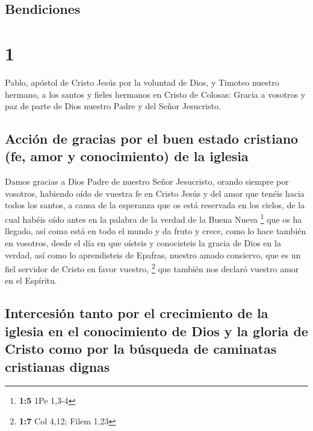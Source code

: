 \hypertarget{bendiciones}{%
\subsection{Bendiciones}\label{bendiciones}}

\hypertarget{section}{%
\section{1}\label{section}}

 Pablo, apóstol de Cristo Jesús por la voluntad de Dios, y
Timoteo nuestro hermano,  a los santos y fieles hermanos
en Cristo de Colosas: Gracia a vosotros y paz de parte de Dios nuestro
Padre y del Señor Jesucristo.

\hypertarget{acciuxf3n-de-gracias-por-el-buen-estado-cristiano-fe-amor-y-conocimiento-de-la-iglesia}{%
\subsection{Acción de gracias por el buen estado cristiano (fe, amor y
conocimiento) de la
iglesia}\label{acciuxf3n-de-gracias-por-el-buen-estado-cristiano-fe-amor-y-conocimiento-de-la-iglesia}}

 Damos gracias a Dios Padre de nuestro Señor Jesucristo,
orando siempre por vosotros,  habiendo oído de vuestra fe
en Cristo Jesús y del amor que tenéis hacia todos los santos,
 a causa de la esperanza que os está reservada en los
cielos, de la cual habéis oído antes en la palabra de la verdad de la
Buena Nueva \footnote{\textbf{1:5} 1Pe 1,3-4}  que os ha
llegado, así como está en todo el mundo y da fruto y crece, como lo hace
también en vosotros, desde el día en que oísteis y conocisteis la gracia
de Dios en la verdad,  así como lo aprendisteis de
Epafras, nuestro amado consiervo, que es un fiel servidor de Cristo en
favor vuestro, \footnote{\textbf{1:7} Col 4,12; Filem 1,23}
 que también nos declaró vuestro amor en el Espíritu.

\hypertarget{intercesiuxf3n-tanto-por-el-crecimiento-de-la-iglesia-en-el-conocimiento-de-dios-y-la-gloria-de-cristo-como-por-la-buxfasqueda-de-caminatas-cristianas-dignas}{%
\subsection{Intercesión tanto por el crecimiento de la iglesia en el
conocimiento de Dios y la gloria de Cristo como por la búsqueda de
caminatas cristianas
dignas}\label{intercesiuxf3n-tanto-por-el-crecimiento-de-la-iglesia-en-el-conocimiento-de-dios-y-la-gloria-de-cristo-como-por-la-buxfasqueda-de-caminatas-cristianas-dignas}}

